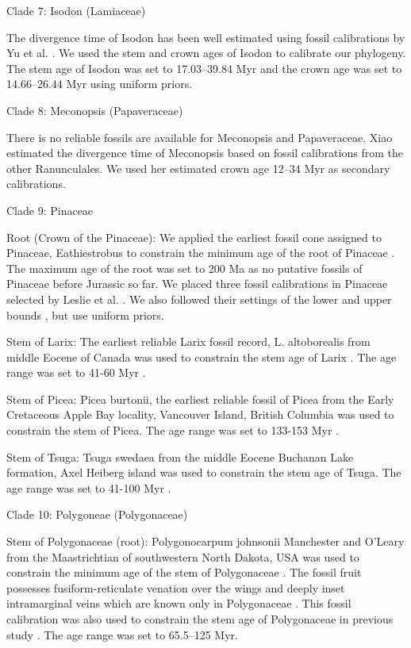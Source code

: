 \documentclass[10pt]{article}
\begin{document}
Clade 7: Isodon (Lamiaceae)

The divergence time of Isodon has been well estimated using fossil
calibrations by Yu et al. \citep{Yu2014}. We used the stem and crown
ages of Isodon to calibrate our phylogeny. The stem age of Isodon was
set to 17.03--39.84 Myr and the crown age was set to 14.66--26.44 Myr
\citep{Yu2014} using uniform priors.

Clade 8: Meconopsis (Papaveraceae)

There is no reliable fossils are available for Meconopsis and
Papaveraceae. Xiao \citep{Xiao2013} estimated the divergence time of
Meconopsis based on fossil calibrations from the other
Ranunculales. We used her estimated crown age 12--34 Myr as secondary
calibrations.

Clade 9: Pinaceae

Root (Crown of the Pinaceae): We applied the earliest fossil cone
assigned to Pinaceae, Eathiestrobus to constrain the minimum age of
the root of Pinaceae \citep{Rothwell2012}. The maximum age of the root
was set to 200 Ma as no putative fossils of Pinaceae before Jurassic
so far. We placed three fossil calibrations in Pinaceae selected by
Leslie et al. \citep{Leslie2012}. We also followed their settings of
the lower and upper bounds \citep{Leslie2012}, but use uniform priors.

Stem of Larix: The earliest reliable Larix fossil record,
L. altoborealis from middle Eocene of Canada was used to constrain the
stem age of Larix \citep{LePage1991}. The age range was
set to 41-60 Myr \citep{Leslie2012}. 

Stem of Picea: Picea burtonii, the earliest reliable fossil of Picea
from the Early Cretaceous Apple Bay locality, Vancouver Island,
British Columbia \citep{Klymiuk2012} was used to constrain the stem of
Picea.  The age range was set to 133-153 Myr \citep{Leslie2012}.

Stem of Tsuga: Tsuga swedaea from the middle Eocene Buchanan Lake
formation, Axel Heiberg island \citep{Lepage2003} was used to
constrain the stem age of Tsuga. The age range was set to 41-100 Myr
\citep{Leslie2012}.

Clade 10: Polygoneae (Polygonaceae)

Stem of Polygonaceae (root): Polygonocarpum johnsonii Manchester and
O’Leary from the Maastrichtian of southwestern North Dakota, USA was
used to constrain the minimum age of the stem of Polygonaceae
\citep{Manchester2010}. The fossil fruit possesses fusiform-reticulate
venation over the wings and deeply inset intramarginal veins which are
known only in Polygonaceae \citep{Manchester2010}. This fossil
calibration was also used to constrain the stem age of Polygonaceae in
previous study \citep{Magallon2015}. The age range was set to
65.5--125 Myr.
\end{document}
